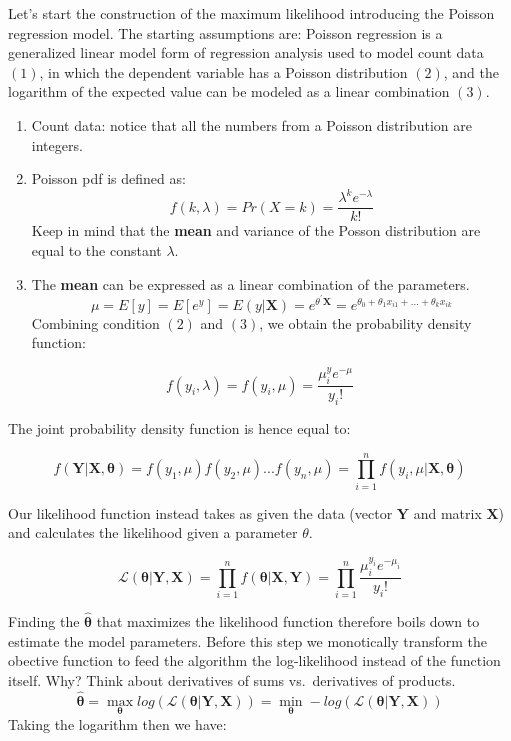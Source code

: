 \documentclass[]{book}
\providecommand{\tightlist}{%
  \setlength{\itemsep}{0pt}\setlength{\parskip}{0pt}}
\begin{document}
Let's start the construction of the maximum likelihood introducing the
Poisson regression model. The starting assumptions are: Poisson
regression is a generalized linear model form of regression analysis
used to model count data \((1)\), in which the dependent variable has a
Poisson distribution \((2)\), and the logarithm of the expected value
can be modeled as a linear combination \((3)\).

\begin{enumerate}
\def\labelenumi{\arabic{enumi}.}
\tightlist
\item
  Count data: notice that all the numbers from a Poisson distribution
  are integers.
\item
  Poisson pdf is defined as:
  \[f(k,\lambda)=Pr(X=k)=\frac{\lambda^k e^{-\lambda}}{k!}\] Keep in
  mind that the \textbf{mean} and variance of the Posson distribution
  are equal to the constant \(\lambda\).
\item
  The \textbf{mean} can be expressed as a linear combination of the
  parameters.
  \[ \mu = E[y] = E[e^{y}] = E(y| \boldsymbol{X})=e^{\theta^{\prime} \boldsymbol{X}}=e^{\theta_0 + \theta_1 x_{i1}+ ... + \theta_k x_{ik} }\]
  Combining condition \((2)\) and \((3)\), we obtain the probability
  density function:
\end{enumerate}

\[f(y_i,\lambda)=f(y_i,\mu)=\frac{\mu^y_i e^{-\mu}}{y_i!}\]

The joint probability density function is hence equal to:

\[f(\boldsymbol{Y}|\boldsymbol{X},\boldsymbol{\theta})=f(y_1,\mu) f(y_2,\mu)...f(y_n,\mu)    = \prod_{i=1}^n f(y_i,\mu|\boldsymbol{X},\boldsymbol{\theta})\]

Our likelihood function instead takes as given the data (vector
\(\boldsymbol{Y}\) and matrix \(\boldsymbol{X}\)) and calculates the
likelihood given a parameter \(\theta\).

\[\mathcal{L}(\boldsymbol{\theta} | \boldsymbol{Y},\boldsymbol{X}) = \prod_{i=1}^n f(\boldsymbol{\theta}|\boldsymbol{X},\boldsymbol{Y}) = \prod_{i=1}^n \frac{\mu_i^{y_i} e^{-\mu_i}}{y_i!}\]

Finding the \(\boldsymbol{\hat{\theta}}\) that maximizes the likelihood
function therefore boils down to estimate the model parameters. Before
this step we monotically transform the obective function to feed the
algorithm the log-likelihood instead of the function itself. Why? Think
about derivatives of sums vs.~derivatives of products.
\[\boldsymbol{\hat{\theta}} = \max_{\boldsymbol{\theta}} log( \mathcal{L}(\boldsymbol{\theta} | \boldsymbol{Y},\boldsymbol{X})) = \min _{\boldsymbol{\theta}} - log( \mathcal{L}(\boldsymbol{\theta} | \boldsymbol{Y},\boldsymbol{X})) \]
Taking the logarithm then we have:
\end{document}
